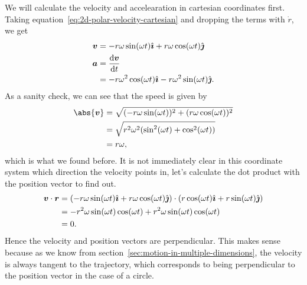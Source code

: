\documentclass[../classical_mechanics.tex]{subfiles}
\begin{document}
        We will calculate the velocity and accelearation in cartesian coordinates first.
        Taking equation~\ref{eq:2d-polar-velocity-cartesian} and dropping the terms with $\dot{r}$, we get
        \begin{align}
            \vec{v}&=-r\omega\sin(\omega t)\ihat+r\omega\cos(\omega t)\jhat\\
            \vec{a}&=\dv{\vec{v}}{t}\\
            &=-r\omega^2\cos(\omega t)\ihat-r\omega^2\sin(\omega t)\jhat.
        \end{align}
        As a sanity check, we can see that the speed is given by
        \begin{align}
            \abs{\vec{v}}&=\sqrt{(-r\omega\sin(\omega t))^2+(r\omega\cos(\omega t))^2}\\
            &=\sqrt{r^2\omega^2(\sin^2(\omega t)+\cos^2(\omega t))}\\
            &=r\omega,
        \end{align}
        which is what we found before.
        It is not immediately clear in this coordinate system which direction the velocity points in, let's calculate the dot product with the position vector to find out.
        \begin{align}
            \boldsymbol{v}\cdot\boldsymbol{r}&=(-r\omega\sin(\omega t)\hat{\boldsymbol{\imath}}+r\omega\cos(\omega t)\hat{\boldsymbol{\jmath}})\cdot(r\cos(\omega t)\hat{\boldsymbol{\imath}}+r\sin(\omega t)\hat{\boldsymbol{\jmath}})\\
            &=-r^2\omega\sin(\omega t)\cos(\omega t)+r^2\omega\sin(\omega t)\cos(\omega t)\\
            &=0.
        \end{align}
        Hence the velocity and position vectors are perpendicular.
        This makes sense because as we know from section~\ref{sec:motion-in-multiple-dimensions}, the velocity is always tangent to the trajectory, which corresponds to being perpendicular to the position vector in the case of a circle.
\end{document}
